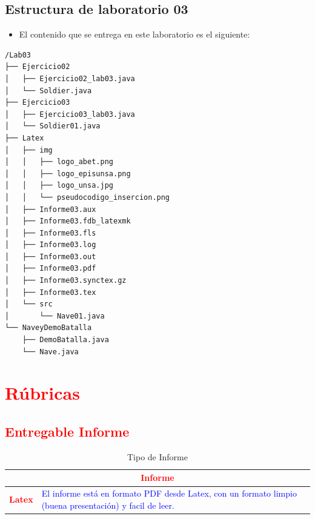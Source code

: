 \documentclass{article}
\begin{document}
	\subsection{Estructura de laboratorio 03}
	\begin{itemize}	
		\item El contenido que se entrega en este laboratorio es el siguiente:
	\end{itemize}
\begin{lstlisting}[style=ascii-tree]
/Lab03
├── Ejercicio02
│   ├── Ejercicio02_lab03.java
│   └── Soldier.java
├── Ejercicio03
│   ├── Ejercicio03_lab03.java
│   └── Soldier01.java
├── Latex
│   ├── img
│   │   ├── logo_abet.png
│   │   ├── logo_episunsa.png
│   │   ├── logo_unsa.jpg
│   │   └── pseudocodigo_insercion.png
│   ├── Informe03.aux
│   ├── Informe03.fdb_latexmk
│   ├── Informe03.fls
│   ├── Informe03.log
│   ├── Informe03.out
│   ├── Informe03.pdf
│   ├── Informe03.synctex.gz
│   ├── Informe03.tex
│   └── src
│       └── Nave01.java
└── NaveyDemoBatalla
    ├── DemoBatalla.java
    └── Nave.java

\end{lstlisting}    
	\section{\textcolor{red}{Rúbricas}}
	
	\subsection{\textcolor{red}{Entregable Informe}}
	\begin{table}[H]
		\caption{Tipo de Informe}
		\setlength{\tabcolsep}{0.5em} %
		{\renewcommand{\arraystretch}{1.5}%
		\begin{tabular}{|p{3cm}|p{12cm}|}
			\hline
			\multicolumn{2}{|c|}{\textbf{\textcolor{red}{Informe}}}  \\
			\hline 
			\textbf{\textcolor{red}{Latex}} & \textcolor{blue}{El informe está en formato PDF desde Latex,  con un formato limpio (buena presentación) y facil de leer.}   \\ 
			\hline 
			
			
		\end{tabular}
	}
	\end{table}
	
	\clearpage
	
\end{document}
